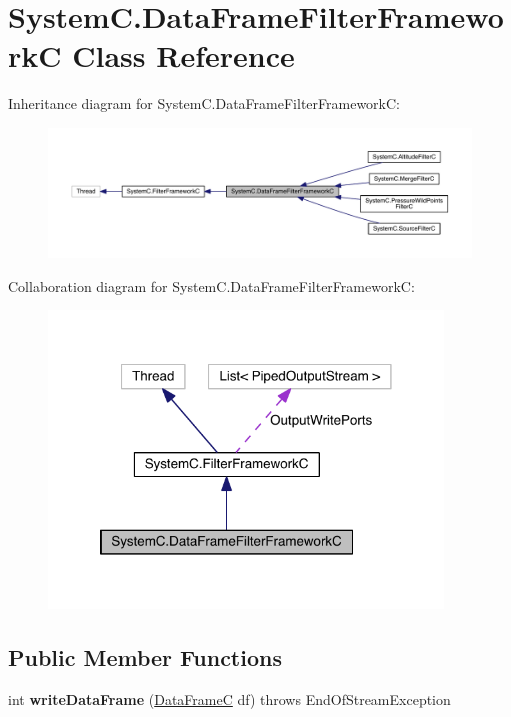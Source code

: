 \hypertarget{class_system_c_1_1_data_frame_filter_framework_c}{}\section{System\+C.\+Data\+Frame\+Filter\+Framework\+C Class Reference}
\label{class_system_c_1_1_data_frame_filter_framework_c}


Inheritance diagram for System\+C.\+Data\+Frame\+Filter\+Framework\+C\+:\nopagebreak
\begin{figure}[H]
\begin{center}
\leavevmode
\includegraphics[width=350pt]{class_system_c_1_1_data_frame_filter_framework_c__inherit__graph}
\end{center}
\end{figure}


Collaboration diagram for System\+C.\+Data\+Frame\+Filter\+Framework\+C\+:\nopagebreak
\begin{figure}[H]
\begin{center}
\leavevmode
\includegraphics[width=297pt]{class_system_c_1_1_data_frame_filter_framework_c__coll__graph}
\end{center}
\end{figure}
\subsection*{Public Member Functions}
\begin{DoxyCompactItemize}
\item 
\hypertarget{class_system_c_1_1_data_frame_filter_framework_c_ab2a11edc5041d19e645ffb63b7831487}{}int {\bfseries write\+Data\+Frame} (\hyperlink{class_system_c_1_1_data_frame_c}{Data\+Frame\+C} df)  throws End\+Of\+Stream\+Exception \label{class_system_c_1_1_data_frame_filter_framework_c_ab2a11edc5041d19e645ffb63b7831487}

\end{DoxyCompactItemize}
